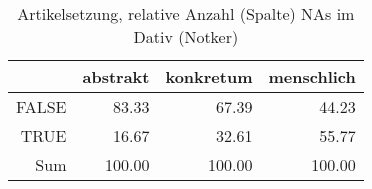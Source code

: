 \begin{table}[ht]
\centering
\begin{tabular}{rrrr}
  \hline
 & abstrakt & konkretum & menschlich \\ 
  \hline
FALSE & 83.33 & 67.39 & 44.23 \\ 
  TRUE & 16.67 & 32.61 & 55.77 \\ 
  Sum & 100.00 & 100.00 & 100.00 \\ 
   \hline
\end{tabular}
\caption{Artikelsetzung, relative Anzahl (Spalte) NAs im Dativ (Notker)} 
\end{table}
